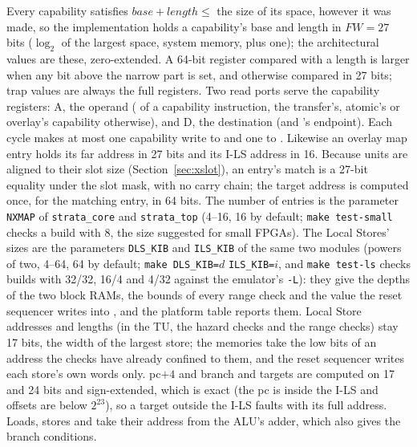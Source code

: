 Every capability satisfies $\mathit{base} + \mathit{length} \le$ the size of its space, however it was
made, so the implementation holds a capability's base and length in $\mathit{FW} = 27$ bits
($\log_2$ of the largest space, system memory, plus one); the architectural values are these,
zero-extended. A 64-bit register compared with a length is larger when any bit above the narrow part
is set, and otherwise compared in 27 bits; trap values are always the full registers. Two read ports
serve the capability registers: A, the operand ( of a capability instruction, the transfer's,
atomic's or overlay's capability otherwise), and D, the destination (and 's endpoint). Each
cycle makes at most one capability write to  and one to . Likewise an overlay map
entry holds its far address in 27 bits and its I-LS address in 16. Because units are aligned to their
slot size (Section~\ref{sec:xslot}), an entry's match is a 27-bit equality under the slot mask, with no
carry chain; the target address is computed once, for the matching entry, in 64 bits. The number of
entries is the parameter \texttt{NXMAP} of \texttt{strata\_core} and \texttt{strata\_top} (4--16, 16 by
default; \texttt{make test-small} checks a build with 8, the size suggested for small FPGAs). The Local
Stores' sizes are the parameters \texttt{DLS\_KIB} and \texttt{ILS\_KIB} of the same two modules (powers
of two, 4--64, 64 by default; \texttt{make DLS\_KIB=}$d$ \texttt{ILS\_KIB=}$i$, and \texttt{make test-ls}
checks builds with 32/32, 16/4 and 4/32 against the emulator's \texttt{-L}): they give the depths of the
two block RAMs, the bounds of every range check and the value the reset sequencer writes into ,
and the platform table reports them. Local Store addresses and lengths (in the TU, the hazard checks
and the range checks) stay 17 bits, the width of the largest store; the memories take the low bits of
an address the checks have already confined to them, and the reset sequencer writes each store's own
words only. pc$+4$ and
branch and  targets are computed on 17 and 24 bits and sign-extended, which is exact (the pc
is inside the I-LS and offsets are below $2^{23}$), so a target outside the I-LS faults with its full
address. Loads, stores and  take their address from the ALU's adder, which also gives the
branch conditions.

